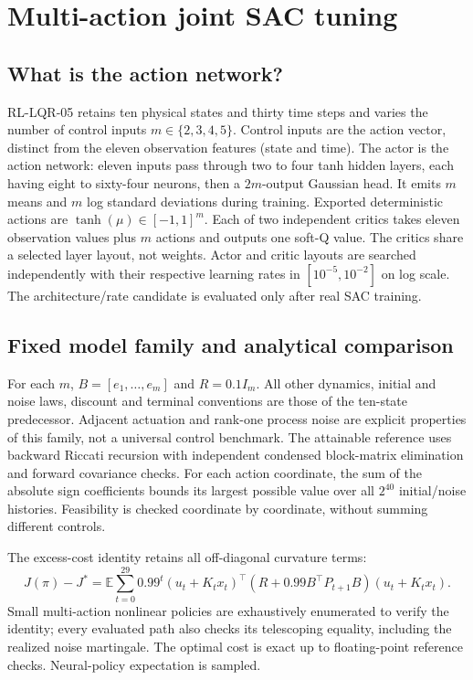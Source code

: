 \chapter{Multi-action joint SAC tuning}
\label{sec:lqr-multi-action}

\section{What is the action network?}
RL-LQR-05 retains ten physical states and thirty time steps and varies the
number of control inputs $m\in\{2,3,4,5\}$. Control inputs are the action
vector, distinct from the eleven observation features (state and time).
The actor is the action network: eleven inputs pass through two to four tanh
hidden layers, each having eight to sixty-four neurons, then a $2m$-output
Gaussian head. It emits $m$ means and $m$ log standard deviations during
training. Exported deterministic actions are $\tanh(\mu)\in[-1,1]^m$.
Each of two independent critics takes eleven observation values plus $m$
actions and outputs one soft-Q value. The critics share a selected layer
layout, not weights. Actor and critic layouts are searched independently
with their respective learning rates in $[10^{-5},10^{-2}]$ on log scale.
The architecture/rate candidate is evaluated only after real SAC training.

\section{Fixed model family and analytical comparison}
For each $m$, $B=[e_1,\ldots,e_m]$ and $R=0.1I_m$. All other dynamics,
initial and noise laws, discount and terminal conventions are those of the
ten-state predecessor. Adjacent actuation and rank-one process noise are
explicit properties of this family, not a universal control benchmark.
The attainable reference uses backward Riccati recursion with independent
condensed block-matrix elimination and forward covariance checks. For each
action coordinate, the sum of the absolute sign coefficients bounds its
largest possible value over all $2^{40}$ initial/noise histories. Feasibility
is checked coordinate by coordinate, without summing different controls.

The excess-cost identity retains all off-diagonal curvature terms:
\[
 J(\pi)-J^*=\mathbb E\sum_{t=0}^{29}0.99^t
 (u_t+K_tx_t)^\top (R+0.99 B^\top P_{t+1}B)(u_t+K_tx_t).
\]
Small multi-action nonlinear policies are exhaustively enumerated to verify
the identity; every evaluated path also checks its telescoping equality,
including the realized noise martingale. The optimal cost is exact up to
floating-point reference checks. Neural-policy expectation is sampled.

